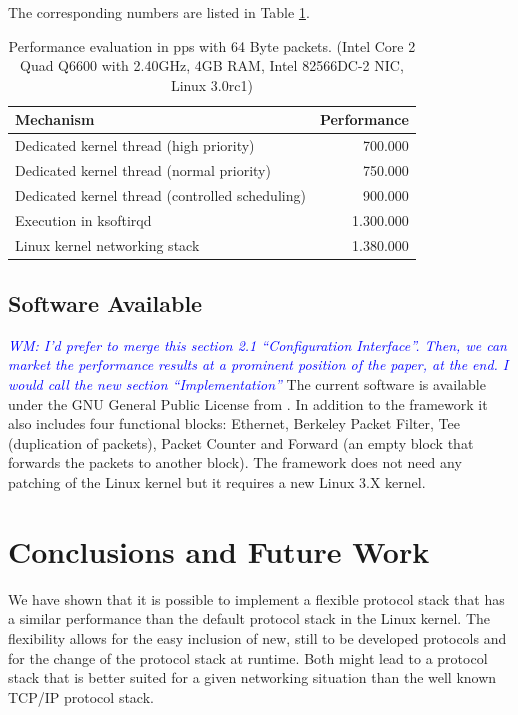 \documentclass{sig-alternate}
\newcommand{\wolfgang}[1]{\textcolor{blue}{\emph{WM: #1}}}
\begin{document}
The corresponding numbers are listed in Table \ref{tab:performance}.
\begin{table}[htb]
\begin{tabular}{ l r }
Mechanism & Performance\\
\hline
Dedicated kernel thread (high priority) & 700.000\\
Dedicated kernel thread (normal priority) & 750.000\\
Dedicated kernel thread (controlled scheduling) & 900.000\\
Execution in ksoftirqd & 1.300.000\\
Linux kernel networking stack & 1.380.000\\
\end{tabular}
\caption{Performance evaluation in pps with 64 Byte packets.
(Intel Core 2 Quad Q6600 with 2.40GHz, 4GB RAM, Intel 82566DC-2 NIC, Linux 3.0rc1)}
\label{tab:performance}
\vspace{-0.2cm}
\end{table}
\newpage
\subsection{Software Available}
\wolfgang{I'd prefer to merge this section 2.1 ``Configuration Interface''. Then, we can market the performance results at a prominent position of the paper, at the end. I would call the new section ``Implementation''}
The current software is available under the GNU General Public License from 
\cite{lana}. In addition to the framework it also includes four functional 
blocks: Ethernet, Berkeley Packet Filter, Tee (duplication of packets), Packet 
Counter and Forward (an empty block that forwards the packets to 
another block). The framework does not need any patching of the Linux kernel
but it requires a new Linux 3.X kernel.

\section{Conclusions and Future Work}
We have shown that it is possible to implement a flexible protocol stack that has a similar performance than the default protocol stack in the Linux kernel. The flexibility allows for the easy inclusion of new, still to be developed protocols and for the change of the protocol stack at runtime. Both might lead to a protocol stack that is better suited for a given networking situation than the well known TCP/IP protocol stack.
\end{document}
